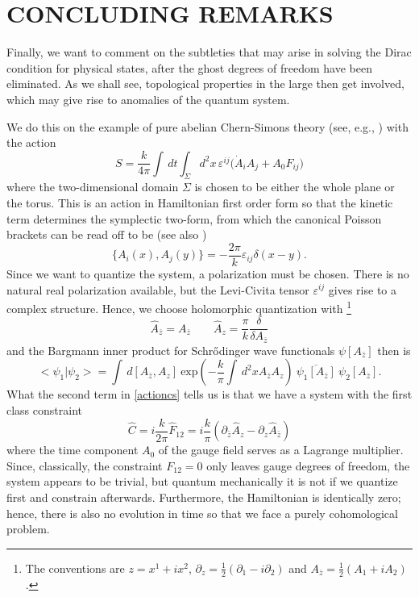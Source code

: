 \documentclass[a4paper,10pt]{article}
\begin{document}
\section{CONCLUDING REMARKS}

Finally, we want to comment on the subtleties that may arise in solving the Dirac 
condition for physical states, after the ghost degrees of freedom have been eliminated. 
As we shall see, topological properties in the large then get involved, which may give rise 
to anomalies of the quantum system.

We do this on the example of pure abelian Chern-Simons theory (see, e.g., \cite{Birm 91}) 
with the action
\begin{equation}\label{actioncs}
S=\frac{k}{4\pi}\int\,dt\int_{\Sigma} 
d^2x\,\varepsilon^{ij}\big(\dot{A}_i A_j + A_0 F_{ij}\big)
\end{equation}
where the two-dimensional domain $\Sigma$ is chosen to be either the whole plane or the 
torus. This is an action in Hamiltonian first order form so that the kinetic term 
determines the symplectic two-form, from which the canonical Poisson brackets can be read 
off to be (see also \cite{Fad 88,Jack 94})
\begin{equation}
\{A_i(x),A_j(y)\}=-\frac{2\pi}{k}\varepsilon_{ij}\delta(x-y).
\end{equation}
Since we want to quantize the system, a polarization \cite{Wood 92} must be chosen. There 
is no natural real polarization available, but the Levi-Civita tensor $\varepsilon^{ij}$ 
gives rise to a complex structure. Hence, we choose holomorphic quantization with 
\footnote{The conventions are $z=x^1+ix^2$, $\partial_z=\frac{1}{2}(\partial_1 - i
\partial_2)$ and $A_{\bar{z}}=\frac{1}{2}(A_1+iA_2)$.}
\begin{equation}
\hat{A}_{\bar{z}}=A_{\bar{z}}\qquad \hat{A}_z=\frac{\pi}{k}\frac{\delta}{\delta 
A_{\bar{z}}}
\end{equation}
and the Bargmann inner product for Schr\H odinger wave functionals 
$\psi[A_{\bar{z}}]$ then is 
\begin{equation}
<\psi_1|\psi_2>=\int \,d{[A_{\bar{z}},A_z]}\:\mathrm{exp}( -
\frac{k}{\pi}\int\,d^2x A_{\bar{z}}A_z)\:\overline{\psi_1[A_{\bar{z}}]}
\:\psi_2[A_{\bar{z}}].
\end{equation}
What the second term in \eqref{actioncs} tells us is that we have a system with the first 
class constraint 
\begin{equation}
\hat{C}=i\frac{k}{2\pi}\hat{F}_{12}=i\frac{k}{\pi}(\partial_{\bar{z}}\hat{A}_z
-\partial_z\hat{A}_{\bar{z}})
\end{equation}
where the time component $A_0$ of the gauge field serves as a Lagrange multiplier. Since,  
classically, the constraint $F_{12}=0$ only leaves gauge degrees of freedom, the system 
appears to be trivial, but quantum mechanically it is not if we quantize first and 
constrain afterwards. Furthermore, the Hamiltonian is identically zero; hence, there is 
also no evolution in time so that we face a purely cohomological problem. 
\end{document}
